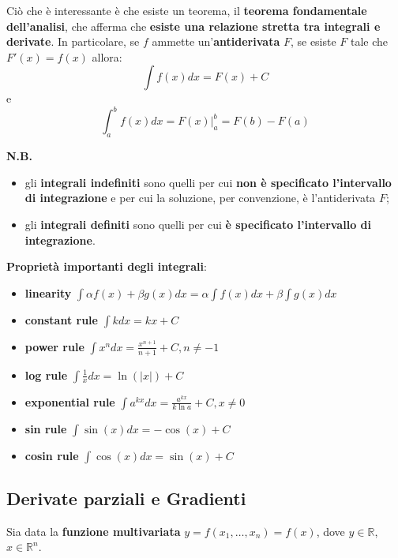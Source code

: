 Ciò che è interessante è che esiste un teorema, il \textbf{teorema fondamentale dell'analisi}, che afferma che \textbf{esiste una relazione stretta tra integrali e derivate}. In particolare, se $f$ ammette un'\textbf{antiderivata} $F$, se esiste $F$ tale che $F'(x)=f(x)$ allora:
\begin{equation}
    \int f(x)dx = F(x)+C
\end{equation}
e
\begin{equation}
    \int_a^b f(x)dx = F(x)|_a^b = F(b)-F(a)
\end{equation}

\textbf{N.B.}
\begin{itemize}
    \item gli \textbf{integrali indefiniti} sono quelli per cui \textbf{non è specificato l'intervallo di integrazione} e per cui la soluzione, per convenzione, è l'antiderivata $F$;
    \item gli \textbf{integrali definiti} sono quelli per cui \textbf{è specificato l'intervallo di integrazione}.
\end{itemize}
\newpage
\textbf{Proprietà importanti degli integrali}:
\begin{itemize}
    \item \textbf{linearity} $\int \alpha f(x)+\beta g(x)dx = \alpha \int f(x)dx+\beta \int g(x)dx$
    \item \textbf{constant rule} $\int kdx = kx+C$
    \item \textbf{power rule} $\int x^n dx = \frac{x^{n+1}}{n+1}+C, n \neq-1$
    \item \textbf{log rule} $\int \frac{1}{x}dx = \ln(|x|)+C$
    \item \textbf{exponential rule} $\int a^{kx}dx = \frac{a^{kx}}{k\ln a}+C,x\neq 0$
    \item \textbf{sin rule} $\int \sin(x)dx = -\cos(x)+C$
    \item \textbf{cosin rule} $\int \cos(x)dx = \sin(x)+C$
\end{itemize}

\subsection{Derivate parziali e Gradienti}
Sia data la \textbf{funzione multivariata} $y=f(x_1,\dots,x_n)=f(x)$, dove $y\in \mathbb{R}$,$x\in \mathbb{R}^n$.


